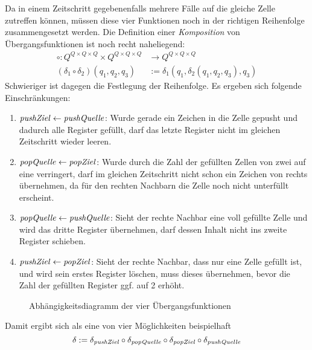 \documentclass{article}
\begin{document}
Da in einem Zeitschritt gegebenenfalls mehrere Fälle auf die gleiche Zelle zutreffen können, müssen diese vier Funktionen noch in der richtigen Reihenfolge zusammengesetzt werden. Die Definition einer \emph{Komposition} von Übergangsfunktionen ist noch recht naheliegend:
\begin{align*}
    \circ : Q^{Q \times Q \times Q} \times Q^{Q \times Q \times Q} &\rightarrow Q^{Q \times Q \times Q} \\
    (\delta_1 \circ \delta_2)(q_1,q_2,q_3) &:= \delta_1(q_1,\delta_2(q_1,q_2,q_3),q_3)
\end{align*}
Schwieriger ist dagegen die Festlegung der Reihenfolge. Es ergeben sich folgende Einschränkungen:
\begin{enumerate}
    \item $\mathit{pushZiel} \leftarrow \mathit{pushQuelle}$: Wurde gerade ein Zeichen in die Zelle gepusht und dadurch alle Register gefüllt, darf \pushQuelle das letzte Register nicht im gleichen Zeitschritt wieder leeren.
    \item $\mathit{popQuelle} \leftarrow \mathit{popZiel}$: Wurde durch \popQuelle die Zahl der gefüllten Zellen von zwei auf eine verringert, darf \popZiel im gleichen Zeitschritt nicht schon ein Zeichen von rechts übernehmen, da für den rechten Nachbarn die Zelle noch nicht unterfüllt erscheint.
    \item $\mathit{popQuelle} \leftarrow \mathit{pushQuelle}$: Sieht der rechte Nachbar eine voll gefüllte Zelle und wird das dritte Register übernehmen, darf \pushQuelle dessen Inhalt nicht ins zweite Register schieben.
    \item $\mathit{pushZiel} \leftarrow \mathit{popZiel}$: Sieht der rechte Nachbar, dass nur eine Zelle gefüllt ist, und wird sein erstes Register löschen, muss \popZiel dieses übernehmen, bevor \pushZiel die Zahl der gefüllten Register ggf. auf 2 erhöht.
\end{enumerate}

\begin{figure}[h]
    \centering
    \caption{Abhängigkeitsdiagramm der vier Übergangsfunktionen}
\end{figure}
Damit ergibt sich als eine von vier Möglichkeiten beispielhaft
\[ \delta := \delta_{\mathit{pushZiel}} \circ \delta_{\mathit{popQuelle}} \circ \delta_{\mathit{popZiel}} \circ \delta_{\mathit{pushQuelle}} \]
\end{document}
